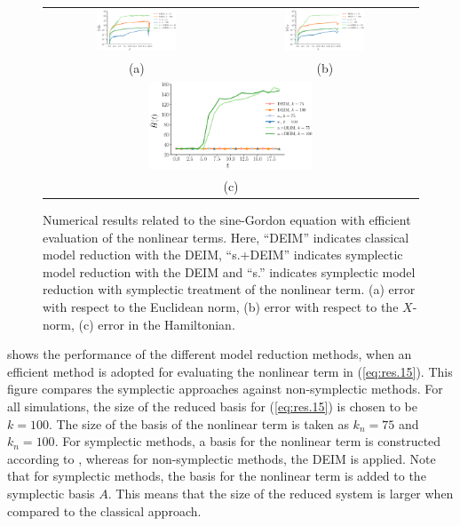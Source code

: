 \begin{figure} 
\begin{tabular}{cc}
\includegraphics[width=0.45\textwidth]{./images/paper2/sine/nonlinear/l2} & \includegraphics[width=0.45\textwidth]{./images/paper2/sine/nonlinear/energy_norm} \\
(a) & (b) \\
\multicolumn{2}{c}{
\includegraphics[width=0.45\textwidth]{./images/paper2/sine/nonlinear/energy}
} \\
\multicolumn{2}{c}{(c)} \\
\end{tabular}
\caption{Numerical results related to the sine-Gordon equation with efficient evaluation of the nonlinear terms. Here, ``DEIM'' indicates classical model reduction with the DEIM, ``s.+DEIM'' indicates symplectic model reduction with the DEIM and ``s.'' indicates symplectic model reduction with symplectic treatment of the nonlinear term. (a) error with respect to the Euclidean norm, (b) error with respect to the $X$-norm, (c) error in the Hamiltonian. } \label{fig:3}
\end{figure}

 shows the performance of the different model reduction methods, when an efficient method is adopted for evaluating the nonlinear term in (\ref{eq:res.15}). This figure compares the symplectic approaches against non-symplectic methods. For all simulations, the size of the reduced basis for (\ref{eq:res.15}) is chosen to be $k=100$. The size of the basis of the nonlinear term is taken as $k_n=75$ and $k_n=100$. For symplectic methods, a basis for the nonlinear term is constructed according to , whereas for non-symplectic methods, the DEIM is applied. Note that for symplectic methods, the basis for the nonlinear term is added to the symplectic basis $A$. This means that the size of the reduced system is larger when compared to the classical approach.

